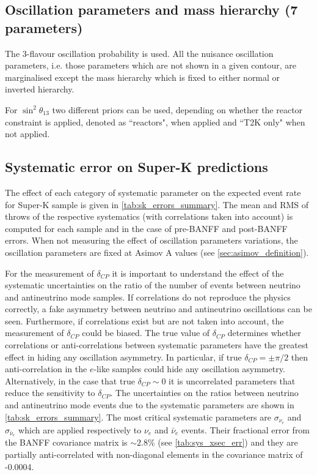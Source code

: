 \FloatBarrier
\clearpage

\subsection{Oscillation parameters and mass hierarchy (7 parameters)}

The 3-flavour oscillation probability is used.  All the nuisance oscillation parameters, i.e. those parameters which are not shown in a given contour, are marginalised except the mass hierarchy which is fixed to either normal or inverted hierarchy.

For $\sin^2 \theta_{13}$ two different priors can be used, depending on whether the reactor constraint is applied, denoted as ``reactors", when applied and ``T2K only" when not applied.



\subsection{Systematic error on Super-K predictions}
\label{sec:systematics:errortables}

The effect of each category of systematic parameter on the expected event rate for Super-K sample is given in \cref{tab:sk_errors_summary}. The mean and RMS of \NumToysSmall throws of the respective systematics (with correlations taken into account) is computed for each sample and in the case of pre-BANFF and post-BANFF errors. When not measuring the effect of oscillation parameters variations, the oscillation parameters are fixed at Asimov A values (see \cref{sec:asimov_definition}).

For the measurement of $\delta_{CP}$ it is important to understand the effect of the systematic uncertainties on the ratio of the number of events between neutrino and antineutrino mode samples. If correlations do not reproduce the physics correctly, a fake asymmetry between neutrino and antineutrino oscillations can be seen. Furthermore, if correlations exist but are not taken into account, the measurement of $\delta_{CP}$ could be biased. The true value of $\delta_{CP}$ determines whether correlations or anti-correlations between systematic parameters have the greatest effect in hiding any oscillation asymmetry. In particular, if true $\delta_{CP} = \pm \pi/2$ then anti-correlation in the $e$-like samples could hide any oscillation asymmetry. Alternatively, in the case that true $\delta_{CP} \sim 0$ it is uncorrelated parameters that reduce the sensitivity to $\delta_{CP}$. The uncertainties on the ratios between neutrino and antineutrino mode events due to the systematic parameters are shown in \cref{tab:sk_errors_summary}. The most critical systematic parameters are $\sigma_{\nu_e}$ and $\sigma_{\bar{\nu}_e}$ which are applied respectively to $\nu_e$ and $\bar{\nu}_e$ events. Their fractional error from the BANFF covariance matrix is $\sim2.8$\% (see \cref{tab:sys_xsec_err}) and they are partially anti-correlated with non-diagonal elements in the covariance matrix of -0.0004.

